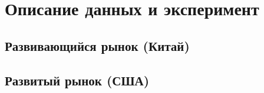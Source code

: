 \section{Описание данных и эксперимент}
	\subsection{Развивающийся рынок (Китай)}
	\subsection{Развитый рынок (США)}